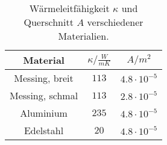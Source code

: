 \begin{table}[!htp]
\centering
\caption{Wärmeleitfähigkeit $\kappa$ und Querschnitt $A$ verschiedener Materialien.}
\label{tab:werte}
\begin{tabular}{c c c}
\toprule
{Material} & {$\kappa / \frac{W}{mK}$} & {$A / m^2$}  \\
\midrule
Messing, breit & $113$ & $4.8 \cdot 10^{-5}$ \\
Messing, schmal & $113$ & $2.8 \cdot 10^{-5}$ \\
Aluminium & $235$ & $4.8 \cdot 10^{-5}$ \\
Edelstahl & $20$ & $4.8 \cdot 10^{-5}$ \\
\bottomrule
\end{tabular}
\end{table}